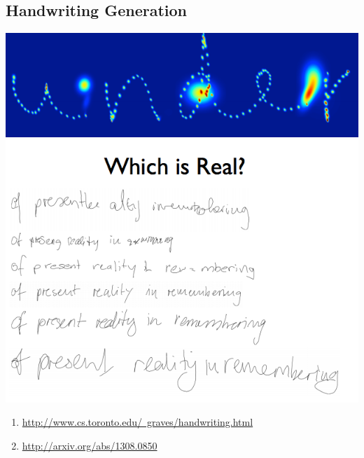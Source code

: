 \documentclass{beamer}
\begin{document}
	\subsection{Handwriting Generation}
	\begin{frame}
		\begin{center}
			\includegraphics[scale=0.2]{img/hwr1}
			\includegraphics[scale=0.35]{img/hwr2}
		\end{center}
		
		\begin{enumerate}
			\item \href{http://www.cs.toronto.edu/~graves/handwriting.html}{http://www.cs.toronto.edu/~graves/handwriting.html}
			\item \href{http://arxiv.org/abs/1308.0850}{http://arxiv.org/abs/1308.0850}
		\end{enumerate}
	\end{frame}
		
	
\end{document}
